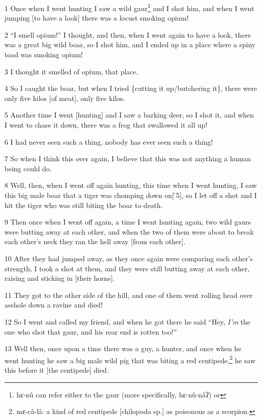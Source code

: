 
1 Once when I went hunting I saw a wild gaur\footnote{hɛ-nû can refer either to the gaur (more specifically, hɛ-nû-nâʔ) or} and I shot him, and when I went
jumping [to have a look] there was a locust smoking opium!

2 ``I smell opium!'' I thought, and then, when I went again to have a look, there
was a great big wild boar, so I shot him, and I ended up in a place where a spiny
toad was smoking opium!

3 I thought it smelled of opium, that place.

4 So I caught the boar, but when I tried \{cutting it up/butchering it\}, there
were only five kilos [of meat], only five kilos.

5 Another time I went [hunting] and I saw a barking deer, so I shot it, and when
I went to chase it down, there was a frog that swallowed it all up!

6 I had never seen such a thing, nobody has ever seen such a thing!

7 So when I think this over again, I believe that this was not anything a human
being could do.

8 Well, then, when I went off again hunting, this time when I went hunting, I saw
this big male boar that a tiger was chomping down on[\.5], so I let off a shot
and I hit the tiger who was still biting the boar to death.

9 Then once when I went off again, a time I went hunting again, two wild gaurs
were butting away at each other, and when the two of them were about to break each
other's neck they ran the hell away [from each other].

10 After they had jumped away, as they once again were comparing each other's strength,
I took a shot at them, and they were still butting away at each other, raising
and sticking in [their horns].

11 They got to the other side of the hill, and one of them went rolling head over
asshole down a ravine and died!

12 So I went and called my friend, and when he got there he said ``Hey, \textit{I'm}
the one who shot that gaur, and his rear end is rotten too!''

13 Well then, once upon a time there was a guy, a hunter, and once when he went
hunting he saw a big male wild pig that was biting a red centipede,\footnote{mɛ-câ-lâ: a kind of red centipede [chilopoda sp.] as poisonous as a scorpion.} he saw this
before it [the centipede] died.

